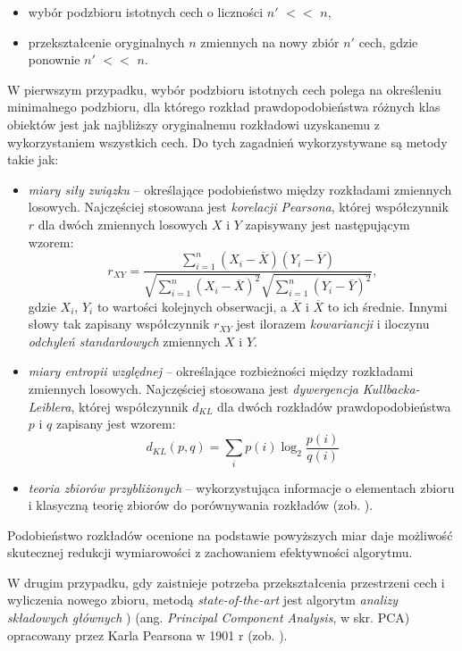 \begin{itemize}
\item wybór podzbioru istotnych cech o liczności $n'$ $<<$ $n$,
\item przekształcenie oryginalnych $n$ zmiennych na nowy zbiór $n'$ cech, gdzie ponownie $n'$ $<<$ $n$.
\end{itemize}

W pierwszym przypadku, wybór podzbioru istotnych cech polega na określeniu minimalnego podzbioru, dla którego rozkład prawdopodobieństwa różnych klas obiektów jest jak najbliższy oryginalnemu rozkładowi uzyskanemu z wykorzystaniem wszystkich cech. Do tych zagadnień wykorzystywane są metody takie jak:
\begin{itemize}
	\item \textit{miary siły związku} -- określające podobieństwo między rozkładami zmiennych losowych. Najczęściej stosowana jest \textit{korelacji Pearsona}, której współczynnik $r$ dla dwóch zmiennych losowych $X$ i $Y$ zapisywany jest następującym wzorem:
	\begin{equation}
	r_{XY} = \frac{\sum_{i=1}^n (X_i - \overline{X})(Y_i - \overline{Y})}{\sqrt{\sum_{i=1}^n (X_i - \overline{X})^2} \sqrt{\sum_{i=1}^n (Y_i - \overline{Y})^2}},
	\end{equation}
	gdzie $X_i$, $Y_i$ to wartości kolejnych obserwacji, a $\overline{X}$ i $\overline{X}$ to ich średnie. Innymi słowy tak zapisany współczynnik $r_{XY}$ jest ilorazem \textit{kowariancji} i iloczynu \textit{odchyleń standardowych} zmiennych $X$ i $Y$.
	\item \textit{miary entropii względnej} --  określające rozbieżności między rozkładami zmiennych losowych. Najczęściej stosowana jest \textit{dywergencja Kullbacka-Leiblera}, której współczynnik $d_{KL}$ dla dwóch rozkładów prawdopodobieństwa $p$ i $q$ zapisany jest wzorem: 
	\begin{equation}
	d_{KL}(p,q) = \sum_{i} p(i) \log_2 \frac{p(i)}{q(i)}
	\end{equation}
	\item \textit{teoria zbiorów przybliżonych} -- wykorzystująca informacje o elementach zbioru i klasyczną teorię zbiorów do porównywania rozkładów (zob. \cite{Kowalik2003}).
\end{itemize}
Podobieństwo rozkładów ocenione na podstawie powyższych miar daje możliwość skutecznej redukcji wymiarowości z zachowaniem efektywności algorytmu.

W drugim przypadku, gdy zaistnieje potrzeba przekształcenia przestrzeni cech i wyliczenia nowego zbioru, metodą \textit{state-of-the-art} jest algorytm \textit{analizy składowych głównych} ) (ang. \textit{Principal Component Analysis}, w skr. PCA) opracowany przez Karla Pearsona w 1901 r (zob. \cite{PCA}).  


